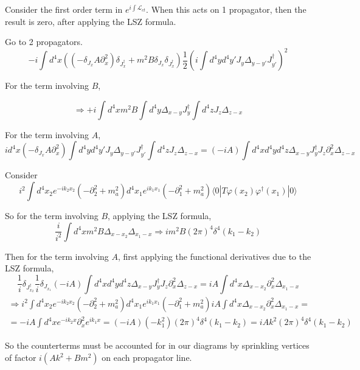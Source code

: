 \documentclass[twoside]{amsart}
\begin{document}
Consider the first order term in $e^{i \int \mathcal{L}_{ct}}$.  When this acts on 1 propagator, then the result is zero, after applying the LSZ formula. 

Go to 2 propagators.  
\[
-i \int d^4x \left( \left( - \delta_{J_x} A \partial_x^2 \right) \delta_{J_x^{\dag}} + m^2 B \delta_{J_x} \delta_{J_x^{\dag} } \right) \frac{1}{2} \left( i \int d^4y d^4y' J_y \Delta_{y-y'} J_{y'}^{\dag} \right)^2  
\]

For the term involving $B$,

\[
\Longrightarrow + i \int d^4x m^2 B \int d^4y \Delta_{x-y} J^{\dag}_y \int d^4z J_z \Delta_{z-x}
\]

For the term involving $A$,
\[
i d^4x ( - \delta_{J_x} A \partial_x^2 ) \int d^4y d^4y' J_y \Delta_{y-y'} J_{y'}^{\dag} \int d^4z J_z \Delta_{z-x} = (-i A) \int d^4x d^4y d^4z \Delta_{x-y} J^{\dag}_y J_z \partial_x^2 \Delta_{z-x}
\]

Consider 
\[
i^2 \int d^4x_2 e^{-ik_2 x_2} ( - \partial_2^2 + m_a^2) d^4x_1 e^{ik_1 x_1} ( - \partial_1^2 + m_a^2) \langle 0 | T \varphi(x_2) \varphi^{\dag}(x_1) | 0 \rangle
\]

So for the term involving $B$, applying the LSZ formula,
\[
\frac{i}{i^2} \int d^4x m^2 B \Delta_{x-x_2} \Delta_{x_1 -x} \Longrightarrow im^2 B (2\pi)^4 \delta^4(k_1 -k_2)
\]

Then for the term involving $A$, first applying the functional derivatives due to the LSZ formula,
\[
\frac{1}{i} \delta_{J_{x_2}^{\dag}} \frac{1}{i} \delta_{J_{x_1} } (-i A) \int d^4x d^4y d^4z \Delta_{x-y} J_y^{ \dag} J_z \partial_x^2 \Delta_{z-x} = i A \int d^4x \Delta_{x-x_2} \partial_x^2\Delta_{x_1- x}
\]
\[
\begin{gathered}
  \Longrightarrow i^2 \int d^4x_2 e^{-ik_2 x_2} ( - \partial_2^2 + m_a^2 ) d^4x_1 e^{ik_1 x_1} ( - \partial^2_1 + m_a^2) i A \int d^4x \Delta_{x-x_2} \partial_x^2 \Delta_{x_1 - x} = \\ 
   = - i A \int d^4x e^{-ik_2 x} \partial_x^2 e^{i k_1 x} = ( - i A) ( - k_1^2 ) ( 2\pi)^4 \delta^4(k_1 - k_2) = i A k^2 ( 2\pi)^4 \delta^4(k_1 - k_2) 
\end{gathered}
\]

So the counterterms must be accounted for in our diagrams by sprinkling vertices of factor $i (Ak^2 + Bm^2)$ on each propagator line.  

\quad \\ 


\end{document}
